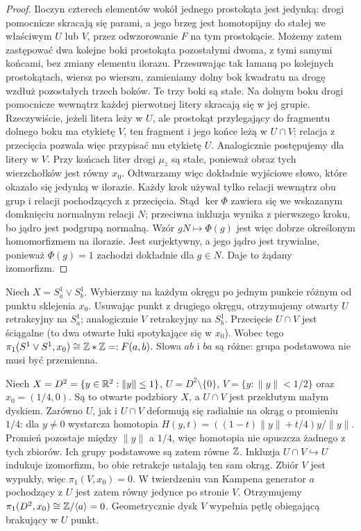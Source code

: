 \begin{proof}
Iloczyn czterech elementów wokół jednego prostokąta jest jedynką:
drogi pomocnicze skracają się parami, a jego brzeg jest homotopijny
do stałej we właściwym $U$ lub $V$, przez odwzorowanie $F$ na tym prostokącie.
Możemy zatem zastępować dwa kolejne boki prostokąta pozostałymi
dwoma, z tymi samymi końcami, bez zmiany elementu ilorazu.
Przesuwając tak łamaną po kolejnych prostokątach, wiersz po wierszu,
zamieniamy dolny bok kwadratu na drogę wzdłuż pozostałych trzech boków.
Te trzy boki są stałe. Na dolnym boku drogi pomocnicze wewnątrz
każdej pierwotnej litery skracają się w jej grupie.
Rzeczywiście, jeżeli litera leży w $U$, ale prostokąt
przylegający do fragmentu dolnego boku ma etykietę $V$,
ten fragment i jego końce leżą w $U\cap V$; relacja
z przecięcia pozwala więc przypisać mu etykietę $U$.
Analogicznie postępujemy dla litery w $V$.
Przy końcach liter drogi $\mu_z$ są stałe, ponieważ
obraz tych wierzchołków jest równy $x_0$.
Odtwarzamy więc dokładnie wyjściowe słowo,
które okazało się jedynką w ilorazie. Każdy krok używał tylko
relacji wewnątrz obu grup i relacji pochodzących z przecięcia.
Stąd $\ker\Phi$ zawiera się we wskazanym domknięciu normalnym
relacji $N$; przeciwna inkluzja wynika z pierwszego kroku,
bo jądro jest podgrupą normalną. Wzór $gN\mapsto\Phi(g)$
jest więc dobrze określonym homomorfizmem na ilorazie.
Jest surjektywny, a jego jądro jest trywialne, ponieważ
$\Phi(g)=1$ zachodzi dokładnie dla $g\in N$. Daje to żądany izomorfizm.
\end{proof}

\begin{przyklad}
\label{prz:pi1-dwa-okregi}
Niech $X=S^1_a\vee S^1_b$.
Wybierzmy na każdym okręgu po jednym
punkcie różnym od punktu sklejenia
$x_0$. Usuwając punkt z drugiego
okręgu, otrzymujemy otwarty $U$
retrakcyjny na $S^1_a$; analogicznie
$V$ retrakcyjny na $S^1_b$.
Przecięcie $U\cap V$ jest ściągalne
(to dwa otwarte łuki spotykające się
w $x_0$). Wobec tego
$\pi_1(S^1\vee S^1,x_0)\cong\mathbb{Z}*\mathbb{Z}=:F(a,b)$.
Słowa $ab$ i $ba$ są różne:
grupa podstawowa nie musi być przemienna.
\end{przyklad}

\begin{przyklad}
\label{prz:van-kampen-dysk}
Niech $X=D^2=\{y\in\mathbb{R}^2:\|y\|\leq1\}$,
$U=D^2\setminus\{0\}$, $V=\{y:\|y\|<1/2\}$
oraz $x_0=(1/4,0)$. Są to otwarte podzbiory $X$,
a $U\cap V$ jest przekłutym małym dyskiem.
Zarówno $U$, jak i $U\cap V$ deformują się radialnie
na okrąg o promieniu $1/4$: dla $y\ne0$ wystarcza
homotopia $H(y,t)=((1-t)\|y\|+t/4)y/\|y\|$.
Promień pozostaje między $\|y\|$ a $1/4$,
więc homotopia nie opuszcza żadnego z tych zbiorów.
Ich grupy podstawowe są zatem równe $\mathbb{Z}$.
Inkluzja $U\cap V\hookrightarrow U$
indukuje izomorfizm, bo obie retrakcje ustalają
ten sam okrąg. Zbiór $V$ jest wypukły, więc
$\pi_1(V,x_0)=0$. W twierdzeniu van Kampena
generator $a$ pochodzący z $U$ jest zatem równy
jedynce po stronie $V$. Otrzymujemy
$\pi_1(D^2,x_0)\cong\mathbb{Z}/\langle a\rangle=0$.
Geometrycznie dysk $V$ wypełnia pętlę obiegającą
brakujący w $U$ punkt.
\end{przyklad}

